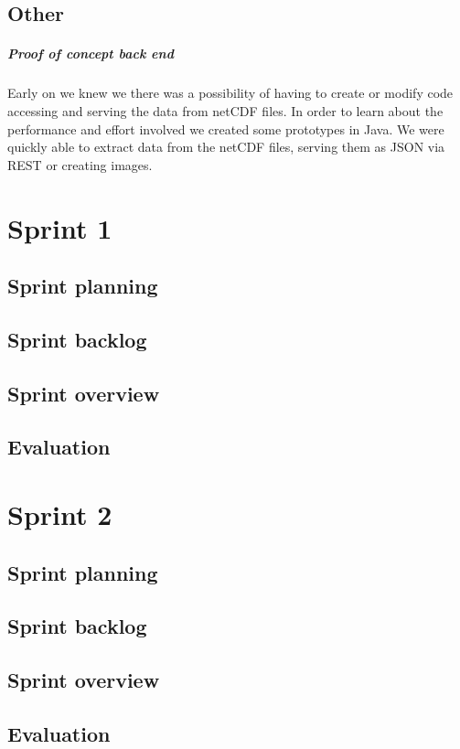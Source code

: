 \documentclass[11pt,a4paper,titlepage,oneside]{report}
\begin{document}
\section{Other}

\paragraph{Proof of concept back end}
Early on we knew we there was a possibility of having to create or modify code accessing and serving the data from netCDF files. In order to learn about the performance and effort involved we created some prototypes in Java. We were quickly able to extract data from the netCDF files, serving them as JSON via REST or creating images.


\chapter{Sprint 1}
\section{Sprint planning}
\section{Sprint backlog}
\section{Sprint overview}
\section{Evaluation}

\chapter{Sprint 2}
\section{Sprint planning}
\section{Sprint backlog}
\section{Sprint overview}
\section{Evaluation}
\end{document}
